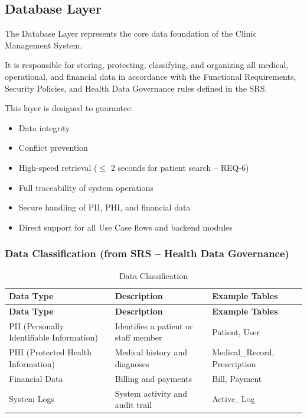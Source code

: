 \subsection{Database Layer}
The Database Layer represents the core data foundation of the Clinic Management System.

It is responsible for storing, protecting, classifying, and organizing all medical, operational, and financial data in accordance with the Functional Requirements, Security Policies, and Health Data Governance rules defined in the SRS.

This layer is designed to guarantee:
\begin{itemize}
	\item Data integrity
	\item Conflict prevention
	\item High-speed retrieval (\(\leq\) 2 seconds for patient search -- REQ-6)
	\item Full traceability of system operations
	\item Secure handling of PII, PHI, and financial data
	\item Direct support for all Use Case flows and backend modules
\end{itemize}

\subsubsection{Data Classification (from SRS – Health Data Governance)}
\begin{longtable}{%
		p{} 
		p{} 
		p{}}
	
	\caption{Data Classification}
	\label{tab:data-classification} \\
	
	\toprule
	\textbf{Data Type} & \textbf{Description} & \textbf{Example Tables} \\
	\midrule
	\endfirsthead
	
	\toprule
	\textbf{Data Type} & \textbf{Description} & \textbf{Example Tables} \\
	\midrule
	\endhead
	
	PII (Personally Identifiable Information) & Identifies a patient or staff member & Patient, User \\[6pt]
	PHI (Protected Health Information) & Medical history and diagnoses & Medical\_Record, Prescription \\[6pt]
	Financial Data & Billing and payments & Bill, Payment \\[6pt]
	System Logs & System activity and audit trail & Active\_Log \\
	
	\bottomrule
\end{longtable}
